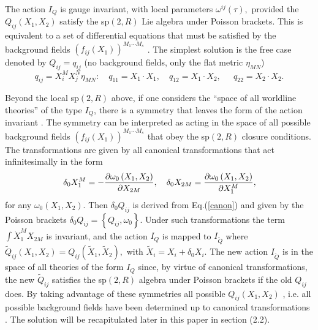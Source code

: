 \documentclass[a4paper,12pt]{article}
\begin{document}
The action $I_{Q}$ is gauge invariant, with local parameters $\omega
^{ij}\left( \tau \right) ,$ provided the $Q_{ij}\left( X_{1},X_{2}\right) $
satisfy the sp$\left( 2,R\right) $ Lie algebra under Poisson brackets. This
is equivalent to a set of differential equations that must be satisfied by
the background fields $\left( f_{ij}\left( X_{1}\right) \right)
^{M_{1}\cdots M_{s}}$ \cite{emgrav}\cite{highspin}. The simplest solution is
the free case denoted by $Q_{ij}=q_{ij}$ (no background fields, only the
flat metric $\eta _{MN}$) 
\begin{equation}
q_{ij}=X_{i}^{M}X_{j}^{N}\eta _{MN}:\quad q_{11}=X_{1}\cdot X_{1},\quad
q_{12}=X_{1}\cdot X_{2},\quad \ \ q_{22}=X_{2}\cdot X_{2}.  \label{qij}
\end{equation}

Beyond the local sp$\left( 2,R\right) $ above, if one considers the ``space
of all worldline theories'' of the type $I_{Q}$, there is a symmetry that
leaves the form of the action invariant \cite{highspin}. The symmetry can be
interpreted as acting in the space of all possible background fields $\left(
f_{ij}\left( X_{1}\right) \right) ^{M_{1}\cdots M_{s}}$ that obey the sp$%
\left( 2,R\right) $ closure conditions. The transformations are given by all
canonical transformations that act infinitesimally in the form 
\begin{equation}
\delta _{0}X_{1}^{M}=-\frac{\partial \omega _{0}\left( X_{1},X_{2}\right) }{%
\partial X_{2M}},\quad \delta _{0}X_{2M}=\frac{\partial \omega _{0}\left(
X_{1},X_{2}\right) }{\partial X_{1}^{M}},  \label{canon}
\end{equation}
for any $\omega _{0}\left( X_{1},X_{2}\right) .$ Then $\delta _{0}Q_{ij}$ is
derived from Eq.(\ref{canon}) and given by the Poisson brackets $\delta
_{0}Q_{ij}=\left\{ Q_{ij},\omega _{0}\right\} .$ Under such transformations
the term $\int \dot{X}_{1}^{M}X_{2M}$ is invariant, and the action $I_{Q}$
is mapped to $I_{\tilde{Q}}$ where $\tilde{Q}_{ij}\left( X_{1},X_{2}\right)
=Q_{ij}\left( \tilde{X}_{1},\tilde{X}_{2}\right) ,$ with $\tilde{X}%
_{i}=X_{i}+\delta _{0}X_{i}.$ The new action $I_{\tilde{Q}}$ is in the space
of all theories of the form $I_{Q}$ since, by virtue of canonical
transformations, the new $\tilde{Q}_{ij}$ satisfies the sp$\left( 2,R\right) 
$ algebra under Poisson brackets if the old $Q_{ij}$ does. By taking
advantage of these symmetries all possible $Q_{ij}\left( X_{1},X_{2}\right) $%
, i.e. all possible background fields have been determined up to canonical
transformations \cite{highspin}. The solution will be recapitulated later in
this paper in section (2.2).
\end{document}
